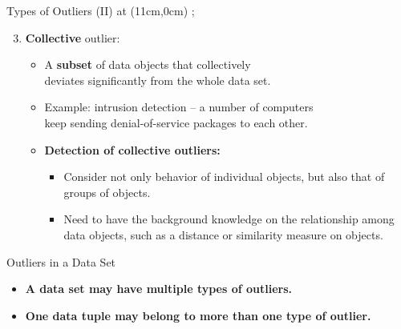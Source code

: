 \begin{frame}{Types of Outliers (II)}
	\tikzoverlay at (11cm,0cm) {};
	\begin{enumerate}
		\setcounter{enumi}{2}
		\item \textbf{Collective} outlier:
		      \begin{itemize}
			      \item A \textbf{subset} of data objects that collectively \\
			            deviates significantly from the whole data set.
			      \item Example: intrusion detection -- a number of computers \\
			            keep sending denial-of-service packages to each other.
			      \item \textbf{Detection of collective outliers:}
			            \begin{itemize}
				            \item Consider not only behavior of individual objects, but also that of groups of objects.
				            \item Need to have the background knowledge on the relationship among data objects, such as a distance or similarity measure on objects.
			            \end{itemize}
		      \end{itemize}
	\end{enumerate}

	\begin{alertblock}{Outliers in a Data Set}
		\begin{itemize}
			\item \textbf{A data set may have multiple types of outliers.}
			\item \textbf{One data tuple may belong to more than one type of outlier.}
		\end{itemize}

	\end{alertblock}
\end{frame}


